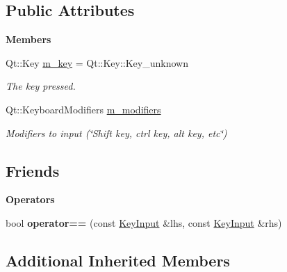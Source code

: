 \subsection*{Public Attributes}
\begin{Indent}\textbf{ Members}\par
\begin{DoxyCompactItemize}
\item 
\mbox{\label{structrev_1_1_key_input_aa434b63191183731528dea93f458bf31}} 
Qt\+::\+Key \mbox{\hyperlink{structrev_1_1_key_input_aa434b63191183731528dea93f458bf31}{m\+\_\+key}} = Qt\+::\+Key\+::\+Key\+\_\+unknown
\begin{DoxyCompactList}\small\item\em The key pressed. \end{DoxyCompactList}\item 
\mbox{\label{structrev_1_1_key_input_a256a76a1385a72300e3a54da987fdfaf}} 
Qt\+::\+Keyboard\+Modifiers \mbox{\hyperlink{structrev_1_1_key_input_a256a76a1385a72300e3a54da987fdfaf}{m\+\_\+modifiers}}
\begin{DoxyCompactList}\small\item\em Modifiers to input (\char`\"{}\+Shift key, ctrl key, alt key, etc\char`\"{}) \end{DoxyCompactList}\end{DoxyCompactItemize}
\end{Indent}
\subsection*{Friends}
\begin{Indent}\textbf{ Operators}\par
\begin{DoxyCompactItemize}
\item 
\mbox{\label{structrev_1_1_key_input_a1f4e1244e8f122d87ef2bc8044c828e2}} 
bool {\bfseries operator==} (const \mbox{\hyperlink{structrev_1_1_key_input}{Key\+Input}} \&lhs, const \mbox{\hyperlink{structrev_1_1_key_input}{Key\+Input}} \&rhs)
\end{DoxyCompactItemize}
\end{Indent}
\subsection*{Additional Inherited Members}


